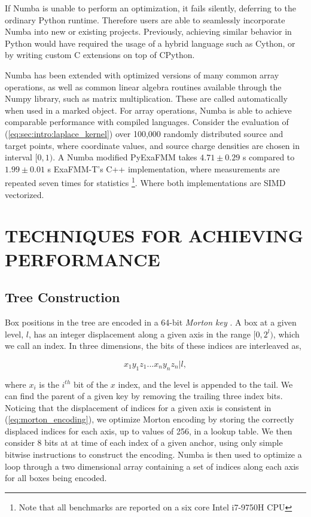 \documentclass{IEEEcsmag}
\begin{document}
If Numba is unable to perform an optimization, it fails silently, deferring to the ordinary Python runtime. Therefore users are able to seamlessly incorporate Numba into new or existing projects. Previously, achieving similar behavior in Python would have required the usage of a hybrid language such as Cython, or by writing custom C extensions on top of CPython.

Numba has been extended with optimized versions of many common array operations, as well as common linear algebra routines available through the Numpy library, such as matrix multiplication. These are called automatically when used in a marked object. For array operations, Numba is able to achieve comparable performance with compiled languages. Consider the evaluation of (\ref{eq:sec:intro:laplace_kernel}) over 100,000 randomly distributed source and target points, where coordinate values, and source charge densities are chosen in interval $[0, 1)$. A Numba modified PyExaFMM takes $4.71 \pm 0.29$ s compared to $1.99 \pm 0.01$ s ExaFMM-T's C++ implementation, where measurements are repeated seven times for statistics \footnote[2]{Note that all benchmarks are reported on a six core Intel i7-9750H CPU}. Where both implementations are SIMD vectorized.

\section{TECHNIQUES FOR ACHIEVING PERFORMANCE}

\subsection{Tree Construction}

Box positions in the tree are encoded in a 64-bit \textit{Morton key} \cite{Sundar2007}. A box at a given level, $l$, has an integer displacement along a given axis in the range $[0, 2^l)$, which we call an index. In three dimensions, the bits of these indices are interleaved as,

\begin{equation}
	\label{eq:morton_encoding}
	x_1y_1z_1...x_ny_nz_n | l,
\end{equation}

where $x_i$ is the $i^{th}$ bit of the $x$ index, and the level is appended to the tail. We can find the parent of a given key by removing the trailing three index bits. Noticing that the displacement of indices for a given axis is consistent in (\ref{eq:morton_encoding}), we optimize Morton encoding by storing the correctly displaced indices for each axis, up to values of 256, in a lookup table. We then consider 8 bits at at time of each index of a given anchor, using only simple bitwise instructions to construct the encoding. Numba is then used to optimize a loop through a two dimensional array containing a set of indices along each axis for all boxes being encoded.
\end{document}
